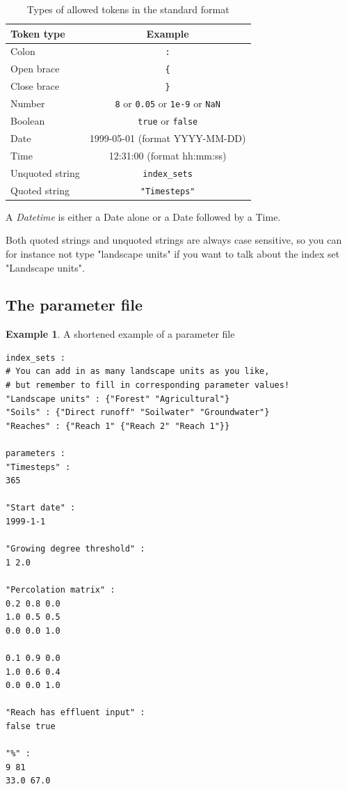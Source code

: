 \documentclass[11pt]{article}
\theoremstyle{definition}
\newtheorem{myexample}{Example}
\newenvironment{example}%
  {\begin{lrbox}{\examplebox}%
   \begin{minipage}{\dimexpr\linewidth-2\fboxsep}
   \begin{myexample}}%
  {\end{myexample}%
   \end{minipage}%
   \end{lrbox}%
   \begin{trivlist}
     \item[]\colorbox{silver}{\usebox\examplebox}
   \end{trivlist}}
\begin{document}
\begin{table}[H]
\centering
\label{tab:tokens}
\begin{tabular}{|l|c|}
\hline
{\bf Token type} & {\bf Example} \\
\hline
Colon & {\tt :}  \\
\hline
Open brace & {\tt \{} \\
\hline
Close brace & {\tt \}} \\
\hline
Number & {\tt 8} or {\tt 0.05} or {\tt 1e-9} or {\tt NaN} \\
\hline
Boolean &{\tt  true} or {\tt false} \\
\hline
Date & 1999-05-01 (format YYYY-MM-DD) \\
\hline
Time & 12:31:00 (format hh:mm:ss) \\
\hline
Unquoted string & {\tt index\_sets} \\
\hline
Quoted string & {\tt "Timesteps"} \\
\hline
\end{tabular}
\caption{Types of allowed tokens in the standard format}
\end{table}

A \emph{Datetime} is either a Date alone or a Date followed by a Time.

Both quoted strings and unquoted strings are always case sensitive, so you can for instance not type "landscape units" if you want to talk about the index set "Landscape units".

\subsection{The parameter file}

\begin{example}\label{ex:parameterfile}
A shortened example of a parameter file
\begin{lstlisting}
index_sets :
# You can add in as many landscape units as you like,
# but remember to fill in corresponding parameter values!
"Landscape units" : {"Forest" "Agricultural"}
"Soils" : {"Direct runoff" "Soilwater" "Groundwater"}
"Reaches" : {"Reach 1" {"Reach 2" "Reach 1"}}

parameters :
"Timesteps" :
365

"Start date" :
1999-1-1

"Growing degree threshold" :
1 2.0

"Percolation matrix" :
0.2 0.8 0.0
1.0 0.5 0.5
0.0 0.0 1.0

0.1 0.9 0.0
1.0 0.6 0.4
0.0 0.0 1.0

"Reach has effluent input" :
false true

"%" :
9 81
33.0 67.0
\end{lstlisting}
\end{example}
\end{document}
